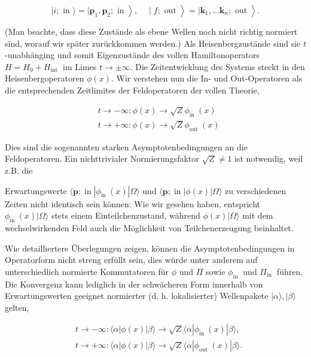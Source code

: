 \documentclass[10pt, letterpaper]{article}
\begin{document}
$$
\left.\left.\left.\mid i ; \text { in }\rangle=\mid \mathbf{p}_{1}, \mathbf{p}_{2} ; \text { in }\right\rangle, \quad \mid f ; \text { out }\right\rangle=\mid \mathbf{k}_{1}, \ldots \mathbf{k}_{n} ; \text { out }\right\rangle .
$$

(Man beachte, dass diese Zustände als ebene Wellen noch nicht richtig normiert sind, worauf wir später zurückkommen werden.) Als Heisenbergzustände sind sie $t$-unabhänging und somit Eigenzustände des vollen Hamiltonoperators $H= H_{0}+H_{\text {int }}$ im Limes $t \rightarrow \pm \infty$. Die Zeitentwicklung des Systems steckt in den Heisenbergoperatoren $\phi(x)$. Wir verstehen nun die In- und Out-Operatoren als die entsprechenden Zeitlimites der Feldoperatoren der vollen Theorie,

$$
\begin{aligned}
& t \rightarrow-\infty: \phi(x) \rightarrow \sqrt{Z} \phi_{\text {in }}(x) \\
& t \rightarrow+\infty: \phi(x) \rightarrow \sqrt{Z} \phi_{\text {out }}(x)
\end{aligned}
$$

Dies sind die sogenannten starken Asymptotenbedingungen an die Feldoperatoren. Ein nichttrivialer Normierungsfaktor $\sqrt{Z} \neq 1$ ist notwendig, weil z.B. die

Erwartungswerte $\langle\mathbf{p} ; \operatorname{in}| \phi_{\text {in }}(x)|\Omega\rangle$ und $\langle\mathbf{p} ; \operatorname{in}| \phi(x)|\Omega\rangle$ zu verschiedenen Zeiten nicht identisch sein können: Wie wir gesehen haben, entspricht $\phi_{\text {in }}(x)|\Omega\rangle$ stets einem Einteilchenzustand, während $\phi(x)|\Omega\rangle$ mit dem wechselwirkenden Feld auch die Möglichkeit von Teilchenerzeugung beinhaltet.

Wie detailliertere Überlegungen zeigen, können die Asymptotenbedingungen in Operatorform nicht streng erfüllt sein, dies würde unter anderem auf unterschiedlich normierte Kommutatoren für $\phi$ und $\Pi$ sowie $\phi_{\text {in }}$ und $\Pi_{\text {in }}$ führen. Die Konvergenz kann lediglich in der schwächeren Form innerhalb von Erwartungswerten geeignet normierter (d. h. lokalisierter) Wellenpakete $|\alpha\rangle,|\beta\rangle$ gelten,

$$
\begin{aligned}
& t \rightarrow-\infty:\langle\alpha| \phi(x)|\beta\rangle \rightarrow \sqrt{Z}\langle\alpha| \phi_{\text {in }}(x)|\beta\rangle, \\
& t \rightarrow+\infty:\langle\alpha| \phi(x)|\beta\rangle \rightarrow \sqrt{Z}\langle\alpha| \phi_{\text {out }}(x)|\beta\rangle .
\end{aligned}
$$
\end{document}

